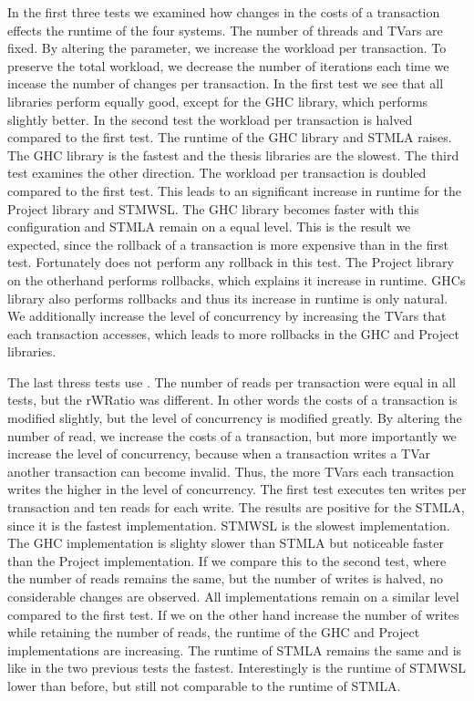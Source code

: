 In the first three tests we examined how changes in the costs of a transaction effects the runtime of the four systems. 
The number of threads and TVars are fixed. By altering the  parameter, we increase the workload per 
transaction. To preserve the total workload, we decrease the number of iterations each time we incease the number
of changes per transaction. In the first test we see that all libraries perform equally good, except for the GHC 
library, which performs slightly better. In the second test the workload per transaction is halved compared to the
first test. The runtime of the GHC library and STMLA raises. The GHC library is the fastest and the thesis libraries 
are the slowest. The third test examines the other direction. The workload per transaction is doubled compared to the 
first test. This leads to an significant increase in runtime for the Project library and STMWSL. The GHC library becomes 
faster with this configuration and STMLA remain on a equal level. This is the result we expected, since the rollback of 
a transaction is more expensive than in the first test. Fortunately does not perform any rollback in this test. The Project
library on the otherhand performs rollbacks, which explains it increase in runtime. GHCs library also performs rollbacks
and thus its increase in runtime is only natural. We additionally increase the level of concurrency by increasing the 
TVars that each transaction accesses, which leads to more rollbacks in the GHC and Project libraries.

The last thress tests use . The number of reads per transaction were equal in all tests, but the 
rWRatio was different. In other words the costs of a transaction is modified slightly, but the level of concurrency
is modified greatly. By altering the number of read, we increase the costs of a transaction, but more importantly we 
increase the level of concurrency, because when a transaction writes a TVar another transaction can become invalid.
Thus, the more TVars each transaction writes the higher in the level of concurrency. The first test executes ten writes
per transaction and ten reads for each write. The results are positive for the STMLA, since it is the fastest implementation.
STMWSL is the slowest implementation. The GHC implementation is slighty slower than STMLA but noticeable faster than the 
Project implementation. If we compare this to the second test, where the number of reads remains the same, but the number of
writes is halved, no considerable changes are observed. All implementations remain on a similar level compared to the first
test. If we on the other hand increase the number of writes while retaining the number of reads, the runtime of the
GHC and Project implementations are increasing. The runtime of STMLA remains the same and is like in the two previous 
tests the fastest. Interestingly is the runtime of STMWSL lower than before, but still not comparable to the runtime of
STMLA.

